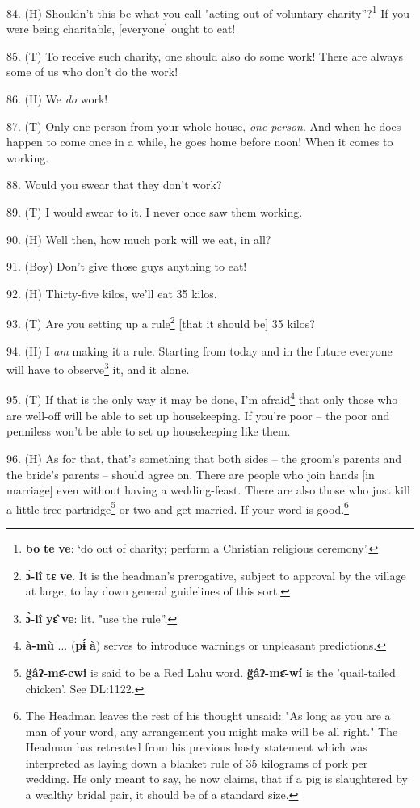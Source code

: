 84. (H) Shouldn't this be what you call "acting out of voluntary charity''?\footnote{\textbf{bo} \textbf{te} \textbf{ve}: `do out of charity; perform a Christian religious ceremony'.}
If you were being charitable, [everyone] ought to eat!

85. (T) To receive such charity, one should also do some work! There are always
some of us who don't do the work!

86. (H) We \textit{do }work!

87. (T) Only one person from your whole house, \textit{one person}. And when he
does happen to come once in a while, he goes home before noon! When it comes to
working.

88. Would you swear that they don't work?

89. (T) I would swear to it. I never once saw them working.

90. (H) Well then, how much pork will we eat, in all?

91. (Boy) Don't give those guys anything to eat!

92. (H) Thirty-five kilos, we'll eat 35 kilos.

93. (T) Are you setting up a rule\footnote{\textbf{ɔ̀-lî} \textbf{tɛ} \textbf{ve}. It is the headman's prerogative, subject to approval by the village at large, to lay down general guidelines of this sort.} [that it should be] 35 kilos?

94. (H) I \textit{am} making it a rule. Starting from today and in the future everyone
will have to observe\footnote{\textbf{ɔ̀-lî} \textbf{yɛ̂} \textbf{ve}: lit. "use the rule''.} it, and it alone.

95. (T) If that is the only way it may be done, I'm afraid\footnote{\textbf{à-mù} ... (\textbf{pɨ́} \textbf{à}) serves to introduce warnings or unpleasant predictions.} that only those
who are well-off will be able to set up housekeeping. If you're poor -- the poor
and penniless won't be able to set up housekeeping like them.

96. (H) As for that, that's something that both sides -- the groom's parents and
the bride's parents -- should agree on. There are people who join hands [in marriage]
even without having a wedding-feast. There are also those who just kill a little
tree partridge\footnote{\textbf{g̈âʔ-mɛ̄-cwi} is said to be a Red Lahu word. \textbf{g̈âʔ-mɛ̄-wí} is the 'quail-tailed chicken'. See DL:1122.} or two and get married. If your word is good.\footnote{The Headman leaves the rest of his thought unsaid: "As long as you are a man of your word, any arrangement you might make will be all right." The Headman has retreated from his previous hasty statement which was interpreted as laying down a blanket rule of 35 kilograms of pork per wedding. He only meant to say, he now claims, that if a pig is slaughtered by a wealthy bridal pair, it should be of a standard size.}

